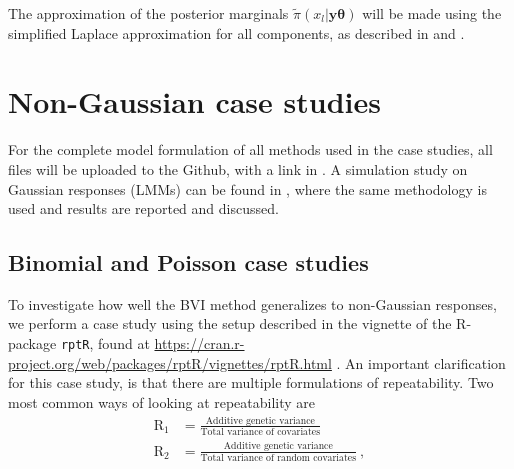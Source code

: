 The approximation of the posterior marginals $\tilde{\pi}(x_l \lvert \mathbf{y} \boldsymbol{\theta})$ will be made using the simplified Laplace approximation for all components, as described in  and .

\section{Non-Gaussian case studies}
For the complete model formulation of all methods used in the case studies, all files will be uploaded to the Github, with a link in . A simulation study on Gaussian responses (LMMs) can be found in \citet{Arnstad}, where the same methodology is used and results are reported and discussed. 
\subsection{Binomial and Poisson case studies}
To investigate how well the BVI method generalizes to non-Gaussian responses, we perform a case study using the setup described in the vignette of the R-package \texttt{rptR}, found at \url{https://cran.r-project.org/web/packages/rptR/vignettes/rptR.html} \citep{Stoffel2017rptR}. An important clarification for this case study, is that there are multiple formulations of repeatability. Two most common ways of looking at repeatability are
\begin{equation}
    \begin{aligned}
        \text{R}_1 &= \frac{\text{Additive genetic variance}}{\text{Total variance of covariates}} \\
        \text{R}_2 &= \frac{\text{Additive genetic variance}}{\text{Total variance of random covariates}} \ ,
    \end{aligned}
\end{equation}
